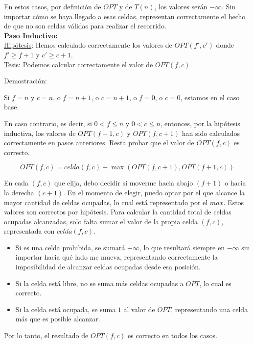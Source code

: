 En estos casos, por definición de $OPT$ y de $T(n)$, los valores serán $-\infty$.
Sin importar cómo se haya llegado a esas celdas,
representan correctamente el hecho de que no son celdas válidas para realizar el recorrido.\\

\textbf{Paso Inductivo:}  \\
\underline{Hipótesis}: Hemos calculado correctamente los valores de \( OPT(f',c') \)
donde \( f' \geq f+1 \) y \( c' \geq c+1 \).\\

\underline{Tesis}: Podemos calcular correctamente el valor de \( OPT(f,c) \).\\

\quad

Demostración:

Si \( f = n \) y \( c = n \), o \( f = n+1 \), o \( c = n+1 \), o \( f = 0 \), o \( c = 0 \), estamos en el caso base.

En caso contrario, es decir, si \( 0 < f \leq n \) y \( 0 < c \leq n \),
entonces, por la hipótesis inductiva, los valores de \( OPT(f+1, c) \) y \( OPT(f, c+1) \) han sido calculados correctamente
en pasos anteriores. Resta probar que el valor de \( OPT(f, c) \) es correcto.

\[
	OPT(f, c) = celda(f, c) + \max\left(OPT(f, c+1), OPT(f+1, c)\right)
\]

En cada $(f,c)$ que elija, debo decidir si moverme hacia abajo $(f+1)$ o hacia la derecha $(c+1)$.
En el momento de elegir, puedo optar por el que alcance la mayor cantidad de celdas ocupadas,
lo cual está representado por el $max$. Estos valores son correctos por hipótesis.
Para calcular la cantidad total de celdas ocupadas alcanzadas,
solo falta sumar el valor de la propia celda $(f,c)$, representada con $celda(f,c)$.

\begin{itemize}
	\item Si es una celda prohibida, se sumará $-\infty$, lo que resultará siempre en $-\infty$
	      sin importar hacia qué lado me mueva, representando correctamente la imposibilidad de alcanzar
	      celdas ocupadas desde esa posición.
	\item Si la celda está libre, no se suma más celdas ocupadas a $OPT$, lo cual es correcto.
	\item Si la celda está ocupada, se suma \( 1 \) al valor de $OPT$, representando una celda más que es posible alcanzar.
\end{itemize}

Por lo tanto, el resultado de \( OPT(f,c) \) es correcto en todos los casos.
\newpage

